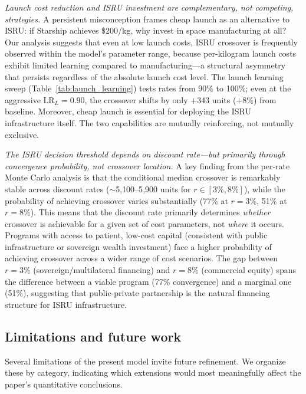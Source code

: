 \documentclass[preprint,12pt]{elsarticle}
\begin{document}
\emph{Launch cost reduction and ISRU investment are complementary, not competing, strategies.} A persistent misconception frames cheap launch as an alternative to ISRU: if Starship achieves \$200/kg, why invest in space manufacturing at all? Our analysis suggests that even at low launch costs, ISRU crossover is frequently observed within the model's parameter range, because per-kilogram launch costs exhibit limited learning compared to manufacturing---a structural asymmetry that persists regardless of the absolute launch cost level. The launch learning sweep (Table~\ref{tab:launch_learning}) tests rates from 90\% to 100\%; even at the aggressive $\mathrm{LR}_L = 0.90$, the crossover shifts by only $+$343 units ($+$8\%) from baseline. Moreover, cheap launch is essential for deploying the ISRU infrastructure itself. The two capabilities are mutually reinforcing, not mutually exclusive.

\emph{The ISRU decision threshold depends on discount rate---but primarily through convergence probability, not crossover location.} A key finding from the per-rate Monte Carlo analysis is that the conditional median crossover is remarkably stable across discount rates ($\sim$5{,}100--5{,}900 units for $r \in [3\%, 8\%]$), while the probability of achieving crossover varies substantially (77\% at $r = 3\%$, 51\% at $r = 8\%$). This means that the discount rate primarily determines \emph{whether} crossover is achievable for a given set of cost parameters, not \emph{where} it occurs. Programs with access to patient, low-cost capital (consistent with public infrastructure or sovereign wealth investment) face a higher probability of achieving crossover across a wider range of cost scenarios. The gap between $r = 3\%$ (sovereign/multilateral financing) and $r = 8\%$ (commercial equity) spans the difference between a viable program (77\% convergence) and a marginal one (51\%), suggesting that public-private partnership is the natural financing structure for ISRU infrastructure.

\subsection{Limitations and future work}

Several limitations of the present model invite future refinement. We organize these by category, indicating which extensions would most meaningfully affect the paper's quantitative conclusions.
\end{document}
